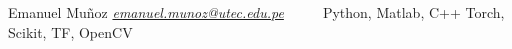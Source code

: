 \documentclass[]{resume-openfont}
\def\ci#1{\textcircled{\resizebox{.5em}{!}{#1}}}
\begin{document}
%
%

%
%
\namesection
{Emanuel}
{Muñoz}
{\href{mailto:emanuel.munoz@utec.edu.pe}{\textit{emanuel.munoz@utec.edu.pe}}} %
{\href{https://github.com/EmanuelSamir}{\ci{\faGithub}}} %
{\href{https://www.linkedin.com/in/EmanuelSamirMP/en}{\ci{\faLinkedin}}} %
{\href{https://scholar.google.com/citations?user=KjixlLsAAAAJ&hl=es&oi=ao}{\ci{\faGraduationCap}}} %
{\href{https://api.whatsapp.com/send/?phone=51947263845}{\ci{\faWhatsapp}}} %
{Python, Matlab, C++} %
{Torch, Scikit, TF, OpenCV} %

%
%
\end{document}
